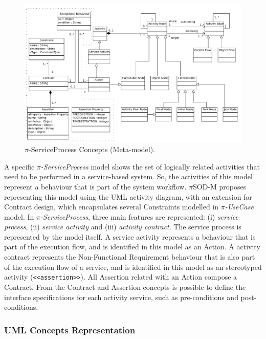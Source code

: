  \begin{figure}[ht!]
\centering
\includegraphics[width=1.0\textwidth]{chapters/methodology/figs/PiServiceProcess.pdf}
\caption{$\pi$-ServiceProcess Concepts (Meta-model).}
\label{fig:serviceprocess}
\end{figure}

A specific \textit{$\pi$-ServiceProcess} model shows the set of logically
related activities that need to be performed in a service-based system. So, the
activities of this model represent a behaviour that is part of the
system workflow. $\pi$SOD-M proposes representing this model using
the UML activity diagram, with an extension for {\sc Contract} design,
which encapsulates several {\sc Constraints} modelled in \textit{$\pi$-UseCase}
model. In \textit{$\pi$-ServiceProcess}, three main features are
represented: (i) \textit{service process}, (ii) \textit{service activity} and
(iii) \textit{activity contract}. The service process is represented by the
model itself. A service activity represents a behaviour that is part of the
execution flow, and is identified in this model as an {\sc Action}. A activity
contract represents the {\sc Non-Functional Requirement} behaviour that is also
part of the execution flow of a service, and is identified in this model as an
stereotyped activity (\texttt{<<assertion>>}). All {\sc Assertion} related with
an {\sc Action} compose a {\sc Contract}. From the {\sc Contract} and {\sc
Assertion} concepts is possible to define the interface specifications
for each activity service, such as pre-conditions and post-conditions.

\subsubsection{UML Concepts Representation} 
  
